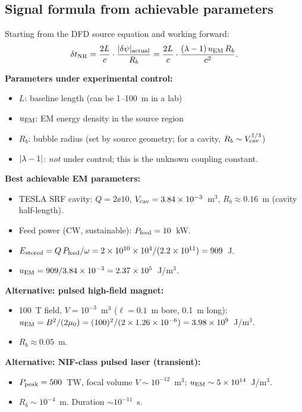 \subsection{Signal formula from achievable parameters}
\label{ssec:honest_formula}

Starting from the DFD source equation and working forward:
\begin{equation}
\delta t_{\rm NR} = \frac{2L}{c} \cdot \frac{|\delta\psi|_{\rm actual}}{R_b}
= \frac{2L}{c} \cdot \frac{(\lambda-1)\,u_{\rm EM}\,R_b}{c^2}.
\label{eq:honest_signal}
\end{equation}

\textbf{Parameters under experimental control:}
\begin{itemize}[nosep]
\item $L$: baseline length (can be 1--100~m in a lab)
\item $u_{\rm EM}$: EM energy density in the source region
\item $R_b$: bubble radius (set by source geometry; for a cavity,
  $R_b \sim V_{\rm cav}^{1/3}$)
\item $|\lambda - 1|$: \emph{not} under control; this is the unknown coupling constant.
\end{itemize}

\textbf{Best achievable EM parameters:}
\begin{itemize}[nosep]
\item TESLA SRF cavity: $Q = 2\ee{10}$, $V_{\rm cav} = 3.84\times 10^{-3}$~m$^3$,
  $R_b \approx 0.16$~m (cavity half-length).
\item Feed power (CW, sustainable): $P_{\rm feed} = 10$~kW.
\item $E_{\rm stored} = Q\,P_{\rm feed}/\omega = 2\times 10^{10} \times 10^4/(2.2\times 10^{11})
  = 909$~J.
\item $u_{\rm EM} = 909/3.84\times 10^{-3} = 2.37\times 10^{5}$~J/m$^3$.
\end{itemize}

\textbf{Alternative: pulsed high-field magnet:}
\begin{itemize}[nosep]
\item 100~T field, $V = 10^{-3}$~m$^3$ ($\ell = 0.1$~m bore, 0.1~m long):
  $u_{\rm EM} = B^2/(2\mu_0) = (100)^2/(2 \times 1.26\times 10^{-6}) = 3.98\times 10^{9}$~J/m$^3$.
\item $R_b \approx 0.05$~m.
\end{itemize}

\textbf{Alternative: NIF-class pulsed laser (transient):}
\begin{itemize}[nosep]
\item $P_{\rm peak} = 500$~TW, focal volume $V \sim 10^{-12}$~m$^3$:
  $u_{\rm EM} \sim 5\times 10^{14}$~J/m$^3$.
\item $R_b \sim 10^{-4}$~m. Duration $\sim 10^{-11}$~s.
\end{itemize}

